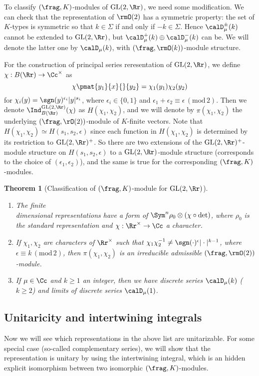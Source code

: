 \documentclass{article}
\newtheorem{theorem}{Theorem}[section]
\newcommand{\GL}{\mathrm{GL}}
\newcommand{\Mod}[1]{\,(\mathrm{mod}\,#1)}
\begin{document}
To classify $(\frag, K)$-modules of $\GL(2, \Rr)$, we need some modification. We can check that the representation of $\rmO(2)$ has a symmetric property: the set of $K$-types is symmetric so that $k\in\Sigma$ if and only if $-k\in \Sigma$. Hence $\calD_{\mu}^{\pm}(k)$ cannot be extended to $\GL(2, \Rr)$, but $\calD_{\mu}^{+}(k)\oplus \calD_{\mu}^{-}(k)$ can be. We will denote the latter one by $\calD_{\mu}(k)$, with $(\frag, \rmO(k))$-module structure. 

For the construction of principal series reresentation of $\GL(2, \Rr)$, we define $\chi: B(\Rr)\to \Cc^{\times}$ as 
$$
\chi\pmat{y_{1}}{x}{}{y_{2}} = \chi_{1}(y_{1})\chi_{2}(y_{2})
$$
for $\chi_{i}(y) = \sgn(y)^{\epsilon_{i}}|y|^{s_{i}}$, where $\epsilon_{i} \in \{0, 1\}$ and $\epsilon_1 + \epsilon_2 \equiv \epsilon \Mod{2}$. 
Then we denote $\Ind_{B(\Rr)}^{\GL(2, \Rr)} (\chi)$ as $H(\chi_1, \chi_2)$, and we will denote by $\pi(\chi_1, \chi_2)$ the underlying $(\frag, \rO(2))$-module of $K$-finite vectors. 
Note that $H(\chi_1, \chi_2) \simeq H(s_1, s_2, \epsilon)$ since each function in $H(\chi_1, \chi_2)$ is determined by its restriction to $\GL(2, \Rr)^{+}$. 
So there are two extensions of the $\GL(2, \Rr)^{+}$-module structure on $H(s_1, s_2, \epsilon)$ to a $\GL(2, \Rr)$-module structure (corresponds to the choice of $(\epsilon_1, \epsilon_2)$), and the same is true for the corresponding $(\frag, K)$-modules. 
\begin{theorem}[Classification of $(\frag, K)$-module for $\GL(2, \Rr)$]
\begin{enumerate}
\item The finite \\dimensional representations have a form of $\Sym^{n}\rho_{0} \otimes (\chi\circ \det)$, where $\rho_{0}$ is the standard representation and $\chi:\Rr^{\times}\to \Cc$ a character. 
\item If $\chi_{1}, \chi_{2}$ are characters of $\Rr^{\times}$ such that $\chi_{1}\chi_{2}^{-1} \neq \sgn(\cdot)^{\epsilon}|\cdot|^{k-1}$, where $\epsilon\equiv k\Mod{2}$, then $\pi(\chi_{1}, \chi_{2})$ is an irreducible admissible $(\frag, \rmO(2))$-module.
\item If $\mu \in \Cc$  and $k\geq 1$ an integer, then we have discrete series $\calD_{\mu}(k)$ ($k\geq 2$) and limits of discrete series $\calD_{\mu}(1)$. 
\end{enumerate}
\end{theorem}

\subsection{Unitaricity and intertwining integrals}
Now we will see which representations in the above list are unitarizable. For some special case (so-called complementary series), we will show that the representation is unitary by using the intertwining integral, which is an hidden explicit isomorphism between two isomorphic $(\frag, K)$-modules. 
\end{document}
